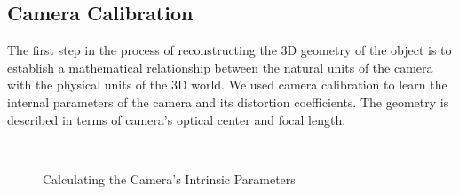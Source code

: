 \subsection{Camera Calibration}

The first step in the process of reconstructing the 3D geometry of the object is to establish a mathematical relationship between the natural units of the camera with the physical units of the 3D world. We used camera calibration to learn the internal parameters of the camera and its distortion coefficients. The geometry is described in terms of camera's optical center and focal length.

\begin{figure}[bht]
\centering
{}\quad
{} \\
\quad
{}
\label{figure:camera-calibration-intrinsics}
\caption{Calculating the Camera's Intrinsic Parameters}
\end{figure}


